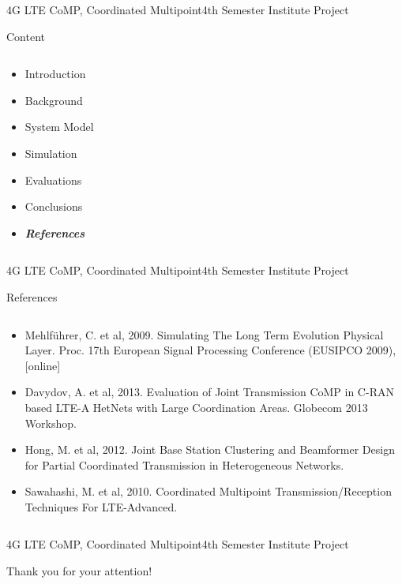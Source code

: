 \documentclass[xcolor={cmyk}]{beamer}
\begin{document}
\begin{frame}{4G LTE CoMP, Coordinated Multipoint}{4th Semester Institute Project}
	\begin{block}{Content}
		\begin{columns}
			\begin{column}{.9\textwidth}
				\begin{itemize}
					\item Introduction
					\item Background
					\item System Model
					\item Simulation
					\item Evaluations
					\item Conclusions
					\item \textbf{\emph{References}}
				\end{itemize}
			\end{column}
		\end{columns}
	\end{block}
\end{frame}

 \begin{frame}{4G LTE CoMP, Coordinated Multipoint}{4th Semester Institute Project}
	 \begin{block}{References}
	 	\begin{columns}
			\begin{column}{.9\textwidth}
				\begin{itemize}
					\item Mehlführer, C. et al, 2009. Simulating The Long Term Evolution Physical Layer. Proc. 17th European Signal Processing Conference (EUSIPCO 2009), [online]
					\item Davydov, A. et al, 2013. Evaluation of Joint Transmission CoMP in C-RAN based LTE-A HetNets with Large Coordination Areas. Globecom 2013 Workshop.
					\item Hong, M. et al, 2012. Joint Base Station Clustering and Beamformer Design for Partial Coordinated Transmission in Heterogeneous Networks.
					\item Sawahashi, M. et al, 2010. Coordinated Multipoint Transmission/Reception Techniques For LTE-Advanced.
				\end{itemize}
			\end{column}
		\end{columns}
	 \end{block}
 \end{frame}
 
  \begin{frame}{4G LTE CoMP, Coordinated Multipoint}{4th Semester Institute Project}
	\begin{block}{Thank you for your attention!}
	\end{block}
 \end{frame}
\end{document}

